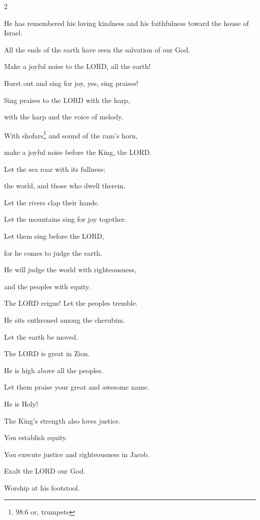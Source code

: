 \begin{multicols}{2}
	
	\myverse{}He has remembered his loving kindness and his faithfulness toward
	the house of Israel.
	
	All the ends of the earth have seen the salvation of our God.
	
	
	\myverse{}Make a joyful noise to the LORD, all the earth!
	
	Burst out and sing for joy, yes, sing praises!
	
	
	\myverse{}Sing praises to the LORD with the harp,
	
	with the harp and the voice of melody.
	
	
	\myverse{}With shofars\footnote{98:6 or, trumpets} and sound of the ram’s
	horn,
	
	make a joyful noise before the King, the LORD.
	
	
	\myverse{}Let the sea roar with its fullness;
	
	the world, and those who dwell therein.
	
	
	\myverse{}Let the rivers clap their hands.
	
	Let the mountains sing for joy together.
	
	
	\myverse{}Let them sing before the LORD,
	
	for he comes to judge the earth.
	
	He will judge the world with righteousness,
	
	and the peoples with equity.
	
	
\mychapter{} \myverse*{}The LORD reigns! Let the peoples tremble.
	
	\quad\quad He sits enthroned among the cherubim.
	
	Let the earth be moved.
	
	
	\myverse{}The LORD is great in Zion.
	
	He is high above all the peoples.
	
	
	\myverse{}Let them praise your great and awesome name.
	
	He is Holy!
	
	\vspace{\baselineskip}
	
	\myverse{}The King’s strength also loves justice.
	
	You establish equity.
	
	You execute justice and righteousness in Jacob.
	
	
	\myverse{}Exalt the LORD our God.
	
	Worship at his footstool.
	

\end{multicols}

